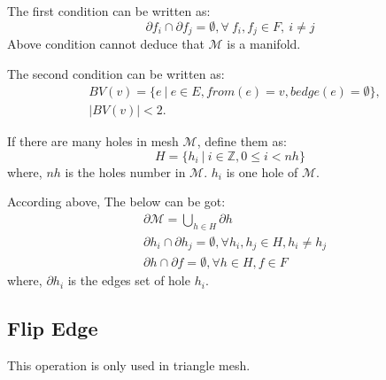 \documentclass[9pt,twocolumn]{extarticle}
\begin{document}
The first condition can be written as:
\begin{equation}
\partial f_i \cap \partial f_j = \emptyset, \forall \ f_i,f_j\in F,\ i\neq j
\label{eq:edgecondition}
\end{equation}
Above condition cannot deduce that $\mathcal{M}$ is a manifold.

The second condition can be written as:
\begin{equation}
\begin{split}
&BV(v)=\{e\ |\ e\in E, from(e)=v,bedge(e)=\emptyset\},\\
&|BV(v)|<2.
\end{split}
\end{equation}

If there are many holes in mesh $\mathcal{M}$, define them as:
\begin{equation}
H=\{h_i\ |\ i\in \mathbb{Z}, 0\leq i<nh \}
\end{equation}
where, $nh$ is the holes number in $\mathcal{M}$. $h_i$ is one hole of $\mathcal{M}$.

According above, The below can be got:
\begin{align}
&\partial \mathcal{M} = \bigcup_{h\in H} \partial h\\
&\partial h_i\cap \partial h_j = \emptyset, \forall h_i,h_j \in H, h_i\neq h_j\\
&\partial h \cap \partial f = \emptyset, \forall h\in H, f\in F
\end{align}
where, $\partial h_i$ is the edges set of hole $h_i$.

\subsection{Flip Edge}
This operation is only used in triangle mesh.





\end{document}
